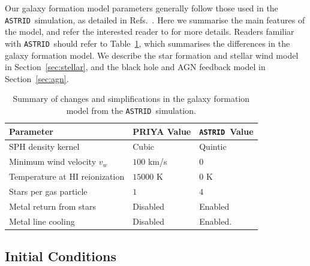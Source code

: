 \documentclass[a4paper,11pt]{article}
\newcommand{\astrid}{\texttt{ASTRID}}
\begin{document}
Our galaxy formation model parameters generally follow those used in the \astrid~simulation, as detailed in Refs.~\cite{Bird:2022, Ni:2021}. Here we summarise the main features of the model, and refer the interested reader to \cite{Bird:2022} for more details. Readers familiar with \astrid~should refer to Table~\ref{tab:paramchanges}, which summarises the differences in the galaxy formation model. We describe the star formation and stellar wind model in Section~\ref{sec:stellar}, and the black hole and AGN feedback model in Section~\ref{sec:agn}.

\begin{table}
\begin{centering}
  \begin{tabular}{lll}
  \hline
  Parameter & PRIYA Value & \astrid~Value \\
    \hline
SPH density kernel  & Cubic & Quintic \\
Minimum wind velocity $v_w$ & $100$ km/s & $0$ \\
Temperature at HI reionization & $15000$ K & $0$ K \\
Stars per gas particle & $1$ & $4$ \\
Metal return from stars & Disabled & Enabled\\
Metal line cooling & Disabled & Enabled. \\
    \hline
  \end{tabular}
  \caption{Summary of changes and simplifications in the galaxy formation model from the \astrid~simulation.}
  \label{tab:paramchanges}
  \end{centering}
\end{table}


\subsection{Initial Conditions}
\label{sec:initconds}
\end{document}
